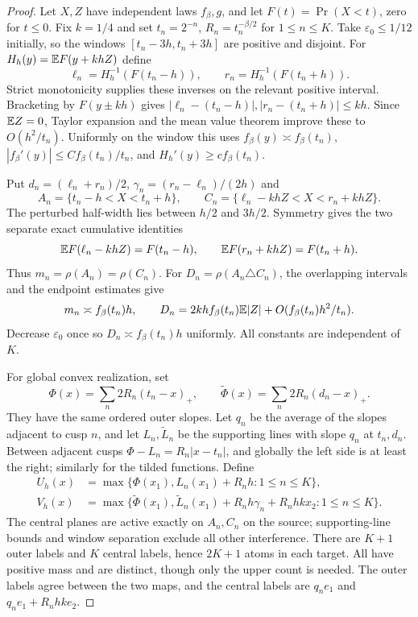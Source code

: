 \documentclass[11pt]{article}
\theoremstyle{remark}\newtheorem{remark}[theorem]{Remark}
\begin{document}
\begin{proof}
Let $X,Z$ have independent laws $f_\beta,g$, and let $F(t)=\Pr(X<t)$, zero for $t\le0$. Fix $k=1/4$ and set
$t_n=2^{-n}$, $R_n=t_n^{-\beta/2}$ for $1\le n\le K$. Take $\varepsilon_0\le1/12$ initially, so the windows $[t_n-3h,t_n+3h]$ are positive and disjoint. For $H_h(y)=\mathbb E F(y+khZ)$ define
\[
 \ell_n=H_h^{-1}(F(t_n-h)),\qquad r_n=H_h^{-1}(F(t_n+h)).
\]
Strict monotonicity supplies these inverses on the relevant positive interval. Bracketing by $F(y\pm kh)$ gives
$|\ell_n-(t_n-h)|,|r_n-(t_n+h)|\le kh$.
Since $\mathbb E Z=0$, Taylor expansion and the mean value theorem improve these to $O(h^2/t_n)$. Uniformly on the window this uses
$f_\beta(y)\asymp f_\beta(t_n)$,
$|f_\beta'(y)|\le C f_\beta(t_n)/t_n$, and
$H_h'(y)\ge c f_\beta(t_n)$.

Put $d_n=(\ell_n+r_n)/2$, $\gamma_n=(r_n-\ell_n)/(2h)$ and
\[
 A_n=\{t_n-h<X<t_n+h\},\qquad
 C_n=\{\ell_n-khZ<X<r_n+khZ\}.
\]
The perturbed half-width lies between $h/2$ and $3h/2$. Symmetry gives the two separate exact cumulative identities
\begin{equation}\label{eq:cumulative}
 \mathbb E F(\ell_n-khZ)=F(t_n-h),\qquad
 \mathbb E F(r_n+khZ)=F(t_n+h).
\end{equation}
Thus $m_n=\rho(A_n)=\rho(C_n)$. For $D_n=\rho(A_n\triangle C_n)$, the overlapping intervals and the endpoint estimates give
\[
 m_n\asymp f_\beta(t_n)h,\qquad
 D_n=2kh f_\beta(t_n)\mathbb E|Z|+O(f_\beta(t_n)h^2/t_n).
\]
Decrease $\varepsilon_0$ once so $D_n\asymp f_\beta(t_n)h$ uniformly. All constants are independent of $K$.

For global convex realization, set
\[
 \Phi(x)=\sum_n2R_n(t_n-x)_+,\qquad
 \widetilde\Phi(x)=\sum_n2R_n(d_n-x)_+.
\]
They have the same ordered outer slopes. Let $q_n$ be the average of the slopes adjacent to cusp $n$, and let $L_n,\widetilde L_n$ be the supporting lines with slope $q_n$ at $t_n,d_n$. Between adjacent cusps
$\Phi-L_n=R_n|x-t_n|$, and globally the left side is at least the right; similarly for the tilded functions. Define
\begin{align*}
 U_h(x)&=\max\{\Phi(x_1),L_n(x_1)+R_nh:1\le n\le K\},\\
 V_h(x)&=\max\{\widetilde\Phi(x_1),
       \widetilde L_n(x_1)+R_nh\gamma_n+R_nhkx_2:1\le n\le K\}.
\end{align*}
The central planes are active exactly on $A_n,C_n$ on the source; supporting-line bounds and window separation exclude all other interference. There are $K+1$ outer labels and $K$ central labels, hence $2K+1$ atoms in each target. All have positive mass and are distinct, though only the upper count is needed. The outer labels agree between the two maps, and the central labels are $q_ne_1$ and $q_ne_1+R_nhk e_2$.


\end{proof}
\end{document}
